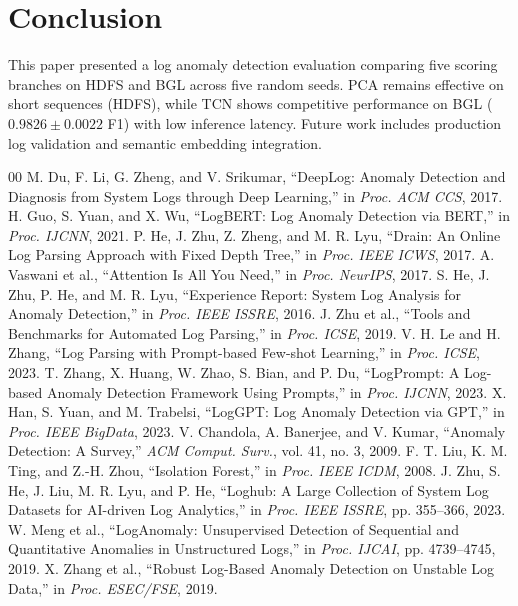 \documentclass[conference]{IEEEtran}
\begin{document}
\section{Conclusion}
This paper presented a log anomaly detection evaluation comparing five scoring branches on HDFS and BGL across five random seeds. PCA remains effective on short sequences (HDFS), while TCN shows competitive performance on BGL ($0.9826 \pm 0.0022$ F1) with low inference latency. Future work includes production log validation and semantic embedding integration.

\begin{thebibliography}{00}
\scriptsize
\setlength{\itemsep}{-1pt}
\setlength{\parskip}{0pt}
 M. Du, F. Li, G. Zheng, and V. Srikumar, ``DeepLog: Anomaly Detection and Diagnosis from System Logs through Deep Learning,'' in \textit{Proc. ACM CCS}, 2017.
 H. Guo, S. Yuan, and X. Wu, ``LogBERT: Log Anomaly Detection via BERT,'' in \textit{Proc. IJCNN}, 2021.
 P. He, J. Zhu, Z. Zheng, and M. R. Lyu, ``Drain: An Online Log Parsing Approach with Fixed Depth Tree,'' in \textit{Proc. IEEE ICWS}, 2017.
 A. Vaswani et al., ``Attention Is All You Need,'' in \textit{Proc. NeurIPS}, 2017.
 S. He, J. Zhu, P. He, and M. R. Lyu, ``Experience Report: System Log Analysis for Anomaly Detection,'' in \textit{Proc. IEEE ISSRE}, 2016.
 J. Zhu et al., ``Tools and Benchmarks for Automated Log Parsing,'' in \textit{Proc. ICSE}, 2019.
 V. H. Le and H. Zhang, ``Log Parsing with Prompt-based Few-shot Learning,'' in \textit{Proc. ICSE}, 2023.
 T. Zhang, X. Huang, W. Zhao, S. Bian, and P. Du, ``LogPrompt: A Log-based Anomaly Detection Framework Using Prompts,'' in \textit{Proc. IJCNN}, 2023.
 X. Han, S. Yuan, and M. Trabelsi, ``LogGPT: Log Anomaly Detection via GPT,'' in \textit{Proc. IEEE BigData}, 2023.
 V. Chandola, A. Banerjee, and V. Kumar, ``Anomaly Detection: A Survey,'' \textit{ACM Comput. Surv.}, vol. 41, no. 3, 2009.
 F. T. Liu, K. M. Ting, and Z.-H. Zhou, ``Isolation Forest,'' in \textit{Proc. IEEE ICDM}, 2008.
 J. Zhu, S. He, J. Liu, M. R. Lyu, and P. He, ``Loghub: A Large Collection of System Log Datasets for AI-driven Log Analytics,'' in \textit{Proc. IEEE ISSRE}, pp. 355--366, 2023.
 W. Meng et al., ``LogAnomaly: Unsupervised Detection of Sequential and Quantitative Anomalies in Unstructured Logs,'' in \textit{Proc. IJCAI}, pp. 4739--4745, 2019.
 X. Zhang et al., ``Robust Log-Based Anomaly Detection on Unstable Log Data,'' in \textit{Proc. ESEC/FSE}, 2019.

\end{thebibliography}
\end{document}
